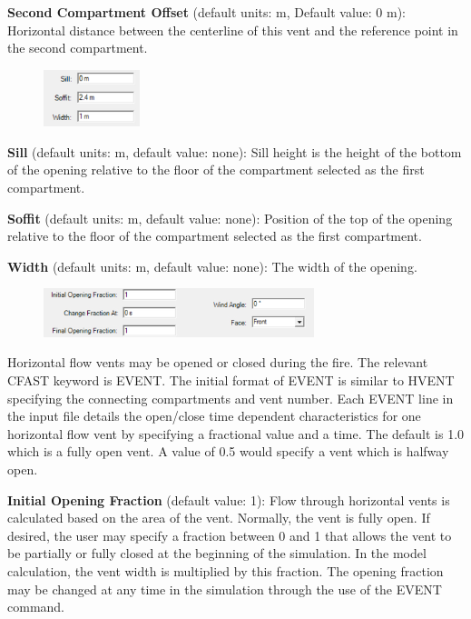 \textbf{Second Compartment Offset } (default units: m, Default value: 0 m): Horizontal distance between the centerline of this vent and the reference point in the second compartment.

\begin{figure}[h!]
\begin{center}
\includegraphics[width=1.1in]{FIGURES/Input_File/Vent_Size}
\end{center}
\end{figure}

\textbf{Sill} (default units: m, default value: none): Sill height is the height of the bottom of the opening relative to the floor of the compartment selected as the first compartment.

\textbf{Soffit} (default units: m, default value: none): Position of the top of the opening relative to the floor of the compartment selected as the first compartment.

\textbf{Width} (default units: m, default value: none): The width of the opening.

\begin{figure}[h!]
\begin{center}
\includegraphics[width=3.1in]{FIGURES/Input_File/Vent_Open_Close}
\end{center}
\end{figure}

Horizontal flow vents may be opened or closed during the fire. The relevant CFAST keyword is EVENT. The initial format of EVENT is similar to HVENT specifying the connecting compartments and vent number.  Each EVENT line in the input file details the open/close time dependent characteristics for one horizontal flow vent by specifying a fractional value and a time.  The default is 1.0 which is a fully open vent.  A value of 0.5 would specify a vent which is halfway open.

\textbf{Initial Opening Fraction} (default value: 1): Flow through horizontal vents is calculated based on the area of the vent.  Normally, the vent is fully open.  If desired, the user may specify a fraction between 0 and 1 that allows the vent to be partially or fully closed at the beginning of the simulation.  In the model calculation, the vent width is multiplied by this fraction.  The opening fraction may be changed at any time in the simulation through the use of the EVENT command.

